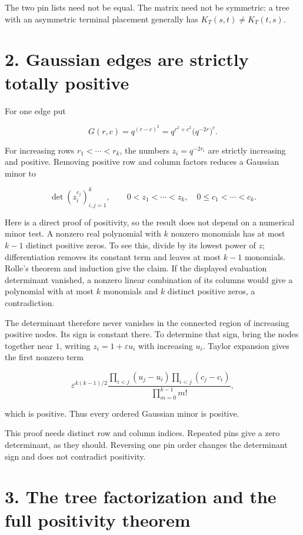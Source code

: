 \documentclass[
  11pt,
  a4paper,
]{report}
\begin{document}
The two pin lists need not be equal. The matrix need not be symmetric: a
tree with an asymmetric terminal placement generally has
\(K_T(s,t)\ne K_T(t,s)\).

\hypertarget{gaussian-edges-are-strictly-totally-positive}{%
\section{2. Gaussian edges are strictly totally
positive}\label{gaussian-edges-are-strictly-totally-positive}}

For one edge put

\[
G(r,c)=q^{(r-c)^2}
      =q^{r^2+c^2}\bigl(q^{-2r}\bigr)^c.
\]

For increasing rows \(r_1<\cdots<r_k\), the numbers \(z_i=q^{-2r_i}\)
are strictly increasing and positive. Removing positive row and column
factors reduces a Gaussian minor to

\[
\det(z_i^{c_j})_{i,j=1}^k,
\qquad 0<z_1<\cdots<z_k,\quad 0\le c_1<\cdots<c_k.
\]

Here is a direct proof of positivity, so the result does not depend on a
numerical minor test. A nonzero real polynomial with \(k\) nonzero
monomials has at most \(k-1\) distinct positive zeros. To see this,
divide by its lowest power of \(z\); differentiation removes its
constant term and leaves at most \(k-1\) monomials. Rolle's theorem and
induction give the claim. If the displayed evaluation determinant
vanished, a nonzero linear combination of its columns would give a
polynomial with at most \(k\) monomials and \(k\) distinct positive
zeros, a contradiction.

The determinant therefore never vanishes in the connected region of
increasing positive nodes. Its sign is constant there. To determine that
sign, bring the nodes together near \(1\), writing
\(z_i=1+\varepsilon u_i\) with increasing \(u_i\). Taylor expansion
gives the first nonzero term

\[
\varepsilon^{k(k-1)/2}
\frac{\prod_{i<j}(u_j-u_i)\prod_{i<j}(c_j-c_i)}
     {\prod_{m=0}^{k-1}m!},
\]

which is positive. Thus every ordered Gaussian minor is positive.

This proof needs distinct row and column indices. Repeated pins give a
zero determinant, as they should. Reversing one pin order changes the
determinant sign and does not contradict positivity.

\hypertarget{the-tree-factorization-and-the-full-positivity-theorem}{%
\section{3. The tree factorization and the full positivity
theorem}\label{the-tree-factorization-and-the-full-positivity-theorem}}
\end{document}

